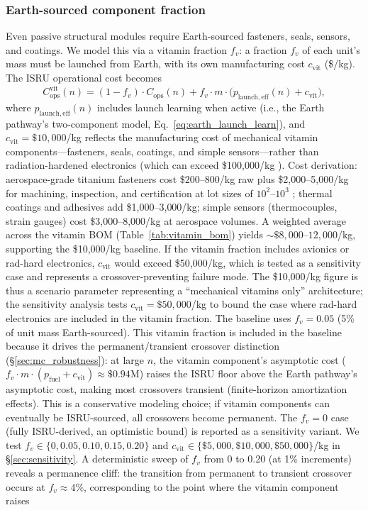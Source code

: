 \documentclass[preprint,12pt]{elsarticle}
\begin{document}
\subsubsection{Earth-sourced component fraction}
\label{sec:vitamin}

Even passive structural modules require Earth-sourced fasteners, seals, sensors, and coatings. We model this via a vitamin fraction $f_v$: a fraction $f_v$ of each unit's mass must be launched from Earth, with its own manufacturing cost $c_{\mathrm{vit}}$ (\$/kg). The ISRU operational cost becomes
\begin{equation}
  C_{\mathrm{ops}}^{\mathrm{vit}}(n) = (1 - f_v) \cdot C_{\mathrm{ops}}(n) + f_v \cdot m \cdot \bigl(p_{\mathrm{launch,eff}}(n) + c_{\mathrm{vit}}\bigr),
  \label{eq:vitamin}
\end{equation}
where $p_{\mathrm{launch,eff}}(n)$ includes launch learning when active (i.e., the Earth pathway's two-component model, Eq.~\ref{eq:earth_launch_learn}), and $c_{\mathrm{vit}} = \$10{,}000$/kg reflects the manufacturing cost of mechanical vitamin components---fasteners, seals, coatings, and simple sensors---rather than radiation-hardened electronics (which can exceed \$100{,}000/kg \cite{wertz2011}). Cost derivation: aerospace-grade titanium fasteners cost \$200--800/kg raw plus \$2{,}000--5{,}000/kg for machining, inspection, and certification at lot sizes of $10^2$--$10^3$ \cite{wertz2011}; thermal coatings and adhesives add \$1{,}000--3{,}000/kg; simple sensors (thermocouples, strain gauges) cost \$3{,}000--8{,}000/kg at aerospace volumes. A weighted average across the vitamin BOM (Table~\ref{tab:vitamin_bom}) yields ${\sim}\$8{,}000$--$12{,}000$/kg, supporting the \$10{,}000/kg baseline. If the vitamin fraction includes avionics or rad-hard electronics, $c_{\mathrm{vit}}$ would exceed \$50{,}000/kg, which is tested as a sensitivity case and represents a crossover-preventing failure mode. The \$10{,}000/kg figure is thus a scenario parameter representing a ``mechanical vitamins only'' architecture; the sensitivity analysis tests $c_{\mathrm{vit}} = \$50{,}000$/kg to bound the case where rad-hard electronics are included in the vitamin fraction. The baseline uses $f_v = 0.05$ (5\% of unit mass Earth-sourced). This vitamin fraction is included in the baseline because it drives the permanent/transient crossover distinction (\S\ref{sec:mc_robustness}): at large $n$, the vitamin component's asymptotic cost ($f_v \cdot m \cdot (p_{\mathrm{fuel}} + c_{\mathrm{vit}}) \approx \$0.94$M) raises the ISRU floor above the Earth pathway's asymptotic cost, making most crossovers transient (finite-horizon amortization effects). This is a conservative modeling choice; if vitamin components can eventually be ISRU-sourced, all crossovers become permanent. The $f_v = 0$ case (fully ISRU-derived, an optimistic bound) is reported as a sensitivity variant. We test $f_v \in \{0, 0.05, 0.10, 0.15, 0.20\}$ and $c_{\mathrm{vit}} \in \{\$5{,}000, \$10{,}000, \$50{,}000\}$/kg in \S\ref{sec:sensitivity}. A deterministic sweep of $f_v$ from 0 to 0.20 (at 1\% increments) reveals a permanence cliff: the transition from permanent to transient crossover occurs at $f_v \approx 4\%$, corresponding to the point where the vitamin component raises 
\end{document}
